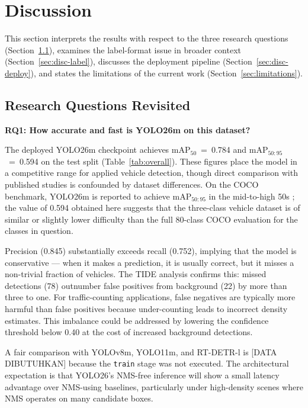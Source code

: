 \section{Discussion}
\label{sec:discussion}

This section interprets the results with respect to the three research
questions (Section~\ref{sec:rq}), examines the label-format issue in
broader context (Section~\ref{sec:disc-label}), discusses the deployment
pipeline (Section~\ref{sec:disc-deploy}), and states the limitations of
the current work (Section~\ref{sec:limitations}).

\subsection{Research Questions Revisited}
\label{sec:rq}

\textbf{RQ1: How accurate and fast is YOLO26m on this dataset?}

The deployed YOLO26m checkpoint achieves mAP$_{50}$~=~0.784 and
mAP$_{50:95}$~=~0.594 on the test split (Table~\ref{tab:overall}).
These figures place the model in a competitive range for applied vehicle
detection, though direct comparison with published studies is confounded
by dataset differences.
On the COCO benchmark, YOLO26m is reported to achieve mAP$_{50:95}$ in
the mid-to-high 50s \cite{yolo262023}; the value of 0.594 obtained here
suggests that the three-class vehicle dataset is of similar or slightly
lower difficulty than the full 80-class COCO evaluation for the classes
in question.

Precision (0.845) substantially exceeds recall (0.752), implying that
the model is conservative — when it makes a prediction, it is usually
correct, but it misses a non-trivial fraction of vehicles.
The TIDE analysis confirms this: missed detections (78) outnumber
false positives from background (22) by more than three to one.
For traffic-counting applications, false negatives are typically more
harmful than false positives because under-counting leads to incorrect
density estimates.
This imbalance could be addressed by lowering the confidence threshold
below 0.40 at the cost of increased background detections.

A fair comparison with YOLOv8m, YOLO11m, and RT-DETR-l is [DATA
DIBUTUHKAN] because the \texttt{train} stage was not executed.
The architectural expectation is that YOLO26's NMS-free inference will
show a small latency advantage over NMS-using baselines, particularly
under high-density scenes where NMS operates on many candidate boxes.

